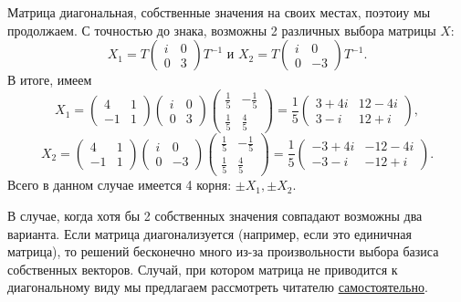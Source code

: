 Матрица диагональная, собственные значения на своих местах, поэтоиу мы продолжаем. С точностью до знака, возможны 2 различных выбора матрицы \( X \):
\begin{equation}
    X_1 = T\begin{pmatrix}
        i & 0\\
        0 & 3
    \end{pmatrix}T^{-1} \text{ и }
    X_2 = T\begin{pmatrix}
        i & 0\\
        0 & -3
    \end{pmatrix}T^{-1}.
\end{equation}
В итоге, имеем
\begin{equation}
    X_1 = \begin{pmatrix}
        4 & 1 \\
        -1 & 1
    \end{pmatrix}
    \begin{pmatrix}
        i & 0\\
        0 & 3
    \end{pmatrix}
    \begin{pmatrix}
        \frac{1}{5} & -\frac{1}{5} \\
        \frac{1}{5} & \frac{4}{5}
    \end{pmatrix}= 
    \frac{1}{5}
    \begin{pmatrix}
        3+4i & 12-4i \\
        3-i & 12+i
    \end{pmatrix},
\end{equation}
\begin{equation}
    X_2 = \begin{pmatrix}
        4 & 1 \\
        -1 & 1
    \end{pmatrix}
    \begin{pmatrix}
        i & 0\\
        0 & -3
    \end{pmatrix}
    \begin{pmatrix}
        \frac{1}{5} & -\frac{1}{5} \\
        \frac{1}{5} & \frac{4}{5}
    \end{pmatrix} = 
    \frac{1}{5}
    \begin{pmatrix}
        -3+4i & -12-4i \\
        -3-i & -12+i
    \end{pmatrix}.
\end{equation}
Всего в данном случае имеется 4 корня: \( \pm X_1, \pm X_2 \).

В случае, когда хотя бы 2 собственных значения совпадают возможны два варианта. Если матрица диагонализуется (например, если это единичная матрица), то решений бесконечно много из-за произвольности выбора базиса собственных векторов. Случай, при котором матрица не приводится к диагональному виду мы предлагаем рассмотреть читателю \href{https://www.sharelatex.com/project/58285dc0dcf62380011eb003}{самостоятельно}.